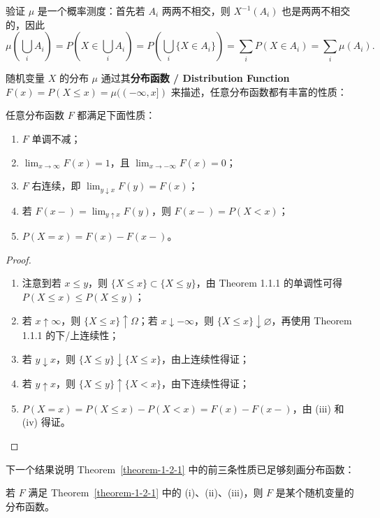 验证 $\mu$ 是一个概率测度：首先若 $A_i$ 两两不相交，则 $X^{-1}(A_i)$ 也是两两不相交的，因此
\[
    \mu \!\left( \bigcup_i A_i \right)
    = P\!\left( X \in \bigcup_i A_i \right)
    = P\!\left( \bigcup_i \{X \in A_i\} \right)
    = \sum_i P(X \in A_i)
    = \sum_i \mu(A_i).
\]

随机变量 $X$ 的分布 $\mu$ 通过其{\normalfont\bfseries 分布函数 / Distribution Function} $F(x) = P(X \le x) = \mu((-\infty,x])$ 来描述，任意分布函数都有丰富的性质：

\begin{theorem}\label{theorem-1-2-1}
    任意分布函数 $F$ 都满足下面性质：
    \begin{enumerate}
        \item $F$ 单调不减；
        \item $\lim_{x \to \infty} F(x) = 1$，且 $\lim_{x \to -\infty} F(x) = 0$；
        \item $F$ 右连续，即 $\lim_{y \downarrow x} F(y) = F(x)$；
        \item 若 $F(x-) = \lim_{y \uparrow x} F(y)$，则 $F(x-) = P(X < x)$；
        \item $P(X = x) = F(x) - F(x-)$。
    \end{enumerate}
\end{theorem}

\begin{proof}
    \begin{enumerate}
        \item 注意到若 $x \le y$，则 $\{X \le x\} \subset \{X \le y\}$，由 Theorem 1.1.1 的单调性可得 $P(X \le x) \le P(X \le y)$；
        \item 若 $x \uparrow \infty$，则 $\{X \le x\} \uparrow \Omega$；若 $x \downarrow -\infty$，则 $\{X \le x\} \downarrow \varnothing$，再使用 Theorem 1.1.1 的下/上连续性；
        \item 若 $y \downarrow x$，则 $\{X \le y\} \downarrow \{X \le x\}$，由上连续性得证；
        \item 若 $y \uparrow x$，则 $\{X \le y\} \uparrow \{X < x\}$，由下连续性得证；
        \item $P(X = x) = P(X \le x) - P(X < x) = F(x) - F(x-)$，由 (iii) 和 (iv) 得证。\qedhere
    \end{enumerate}
\end{proof}

下一个结果说明 Theorem~\ref{theorem-1-2-1} 中的前三条性质已足够刻画分布函数：

\begin{theorem}\label{theorem-1-2-2}
    若 $F$ 满足 Theorem~\ref{theorem-1-2-1} 中的 (i)、(ii)、(iii)，则 $F$ 是某个随机变量的分布函数。
\end{theorem}


